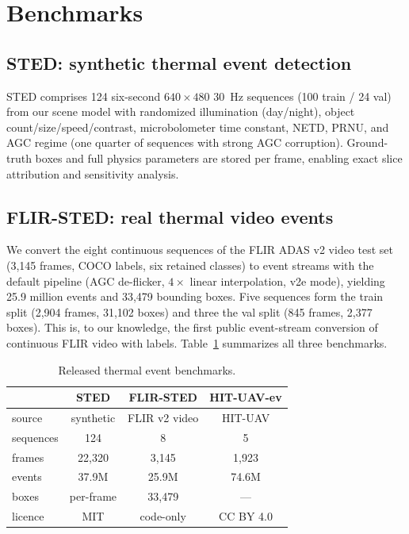 \section{Benchmarks}
\label{sec:benchmark}

\subsection{STED: synthetic thermal event detection}
STED comprises 124 six-second $640{\times}480$ \SI{30}{\hertz} sequences
(100 train / 24 val) from our scene model with randomized illumination
(day/night), object count/size/speed/contrast, microbolometer time
constant, NETD, PRNU, and AGC regime (one quarter of sequences with strong
AGC corruption). Ground-truth boxes and full physics parameters are stored
per frame, enabling exact slice attribution and sensitivity analysis.

\subsection{FLIR-STED: real thermal video events}
\label{sec:flirsted}
We convert the eight continuous sequences of the FLIR ADAS v2 video test
set (3{,}145 frames, COCO labels, six retained classes) to event streams
with the default pipeline (AGC de-flicker, $4\times$ linear interpolation,
v2e mode), yielding 25.9 million events and 33{,}479 bounding boxes.
Five sequences form the train split (2{,}904 frames, 31{,}102 boxes) and
three the val split (845 frames, 2{,}377 boxes). This is, to our knowledge,
the first public event-stream conversion of continuous FLIR video with
labels. Table~\ref{tab:datasets} summarizes all three benchmarks.

\begin{table}[t]
\centering
\caption{Released thermal event benchmarks.}
\label{tab:datasets}
\begin{tabular}{lccc}
\toprule
 & STED & FLIR-STED & HIT-UAV-ev \\
\midrule
source & synthetic & FLIR v2 video & HIT-UAV \\
sequences & 124 & 8 & 5 \\
frames & 22{,}320 & 3{,}145 & 1{,}923 \\
events & 37.9M & 25.9M & 74.6M \\
boxes & per-frame & 33{,}479 & --- \\
licence & MIT & code-only & CC BY 4.0 \\
\bottomrule
\end{tabular}
\end{table}

